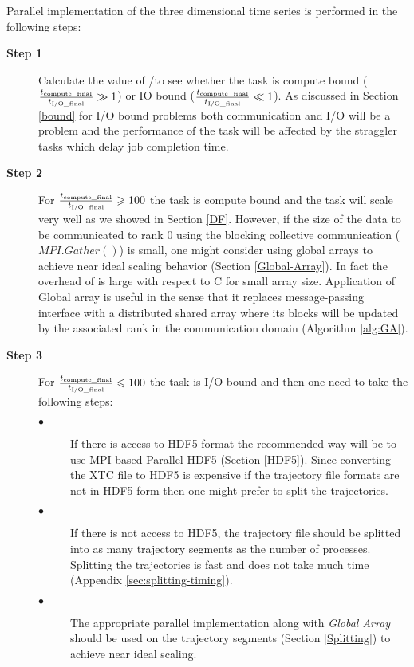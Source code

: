 \label{guideline}
Parallel implementation of the three dimensional time series is performed in the following steps:

\begin{description}
  \item[\textbf{Step 1}] Calculate the value of \tcomp/\tIO to see whether the task is compute bound ($\frac{{t}_{\text{compute\_final}}}{{t}_{\text{I/O\_final}}} \gg 1$) or IO bound ($\frac{{t}_{\text{compute\_final}}}{{t}_{\text{I/O\_final}}} \ll 1$). As discussed in Section \ref{bound} for I/O bound problems both communication and I/O will be a problem and the performance of the task will be affected by the straggler tasks which delay job completion time.  
  
  \item[\textbf{Step 2}] For $\frac{{t}_{\text{compute\_final}}}{{t}_{\text{I/O\_final}}} \geqslant 100$ the task is compute bound and the task will scale very well as we showed in Section \ref{DF}. However, if the size of the data to be communicated to rank 0 using the blocking collective communication ($MPI.Gather()$) is small, one might consider using global arrays to achieve near ideal scaling behavior (Section \ref{Global-Array}). In fact the overhead of  is large with respect to C for small array size. Application of Global array is useful in the sense that it replaces message-passing interface with a distributed shared array where its blocks will be updated by the associated rank in the communication domain (Algorithm \ref{alg:GA}). 
  \item[\textbf{Step 3}] For $\frac{{t}_{\text{compute\_final}}}{{t}_{\text{I/O\_final}}} \leqslant 100$ the task is I/O bound and then one need to take the following steps:
   
\begin{description}
  \item[$\bullet$] If there is access to HDF5 format the recommended way will be to use MPI-based Parallel HDF5 (Section \ref{HDF5}). Since converting the XTC file to HDF5 is expensive if the trajectory file formats are not in HDF5 form then one might prefer to split the trajectories. 
  \item[$\bullet$] If there is not access to HDF5, the trajectory file should be splitted into as many trajectory segments as the number of processes. Splitting the trajectories is fast and does not take much time (Appendix \ref{sec:splitting-timing}).
  \item[$\bullet$] The appropriate parallel implementation along with \emph{Global Array} should be used on the trajectory segments (Section \ref{Splitting}) to achieve near ideal scaling.
\end{description}
   
\end{description}


